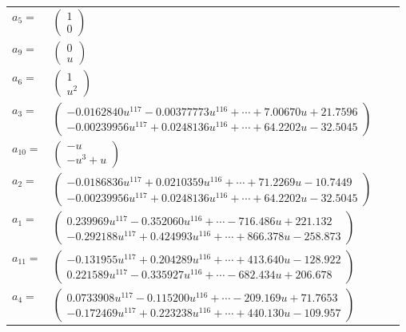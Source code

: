 \documentclass[1p]{elsarticle_modified}
\theoremstyle{definition}
\begin{document}
\begin{tabular}{m{7pt} m{180pt} m{7pt} m{180pt} }
\flushright $a_{5}=$&$\begin{pmatrix}1\\0\end{pmatrix}$ \\
\flushright $a_{9}=$&$\begin{pmatrix}0\\u\end{pmatrix}$ \\
\flushright $a_{6}=$&$\begin{pmatrix}1\\u^2\end{pmatrix}$ \\
\flushright $a_{3}=$&$\begin{pmatrix}-0.0162840 u^{117}-0.00377773 u^{116}+\cdots+7.00670 u+21.7596\\-0.00239956 u^{117}+0.0248136 u^{116}+\cdots+64.2202 u-32.5045\end{pmatrix}$ \\
\flushright $a_{10}=$&$\begin{pmatrix}- u\\- u^3+u\end{pmatrix}$ \\
\flushright $a_{2}=$&$\begin{pmatrix}-0.0186836 u^{117}+0.0210359 u^{116}+\cdots+71.2269 u-10.7449\\-0.00239956 u^{117}+0.0248136 u^{116}+\cdots+64.2202 u-32.5045\end{pmatrix}$ \\
\flushright $a_{1}=$&$\begin{pmatrix}0.239969 u^{117}-0.352060 u^{116}+\cdots-716.486 u+221.132\\-0.292188 u^{117}+0.424993 u^{116}+\cdots+866.378 u-258.873\end{pmatrix}$ \\
\flushright $a_{11}=$&$\begin{pmatrix}-0.131955 u^{117}+0.204289 u^{116}+\cdots+413.640 u-128.922\\0.221589 u^{117}-0.335927 u^{116}+\cdots-682.434 u+206.678\end{pmatrix}$ \\
\flushright $a_{4}=$&$\begin{pmatrix}0.0733908 u^{117}-0.115200 u^{116}+\cdots-209.169 u+71.7653\\-0.172469 u^{117}+0.223238 u^{116}+\cdots+440.130 u-109.957\end{pmatrix}$ \\

\end{tabular}
\end{document}
